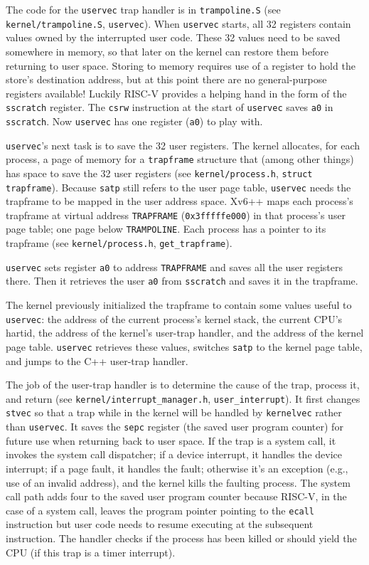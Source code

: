 The code for the {\tt uservec} trap handler is in {\tt trampoline.S}
(see \texttt{kernel/trampoline.S}, \texttt{uservec}).
When {\tt uservec} starts, all 32 registers contain values owned by
the interrupted user code. These 32 values need to be saved somewhere
in memory, so that later on
the kernel can restore them before returning to user space.
Storing to memory requires use of a register
to hold the store's destination address,
but at this point there are no general-purpose registers available!
Luckily RISC-V provides a helping hand in the
form of the {\tt sscratch} register. The {\tt csrw} instruction at
the start of {\tt uservec} saves {\tt a0} in {\tt
  sscratch}. Now
{\tt uservec} has
one register ({\tt a0}) to play with.

{\tt uservec}'s next task is to save the 32 user registers.
The kernel allocates, for each process, a page of memory for a
{\tt trapframe} structure that (among other things) has space to
save the 32 user registers
(see \texttt{kernel/process.h}, \texttt{struct trapframe}). Because {\tt satp} still
refers to the user page table, {\tt uservec} needs the trapframe to be
mapped in the user address space. Xv6++ maps each process's trapframe
at virtual address {\tt TRAPFRAME} ({\tt 0x3fffffe000}) in that process's user page table;
one page below {\tt TRAMPOLINE}.
Each process has a pointer to its trapframe
(see \texttt{kernel/process.h}, \texttt{get\_trapframe}).

{\tt uservec} sets register {\tt a0} to address {\tt TRAPFRAME}
and saves all the user registers there.
Then it retrieves the user {\tt a0} from {\tt sscratch} and
saves it in the trapframe.

The kernel previously initialized the trapframe to contain some
values useful to {\tt uservec}:
the address of the current process's
kernel stack, the current CPU's hartid, the address of the kernel's user-trap handler,
and the address of the kernel page table. {\tt uservec}
retrieves these values, switches {\tt satp} to the kernel page table,
and jumps to the C++ user-trap handler.

The job of the user-trap handler is to determine
the cause of the trap, process it, and return
(see \texttt{kernel/interrupt\_manager.h}, \texttt{user\_interrupt}).
It first changes {\tt stvec} so
that a trap while in the kernel will be handled by
{\tt kernelvec} rather than {\tt uservec}.
It saves the {\tt sepc} register (the saved user program counter)
for future use when returning back to user space.
If the trap is a system call, it invokes the system call dispatcher;
if a device interrupt, it handles the device interrupt;
if a page fault, it handles the fault;
otherwise it's an exception (e.g., use of an invalid address),
and the kernel kills the faulting process.
The system call path adds four to the saved user program counter
because RISC-V, in the case of a system call,
leaves the program pointer pointing to the {\tt ecall} instruction
but user code needs to resume executing at the subsequent instruction.
The handler checks if the process has been
killed or should yield the CPU (if this trap is a timer interrupt).

